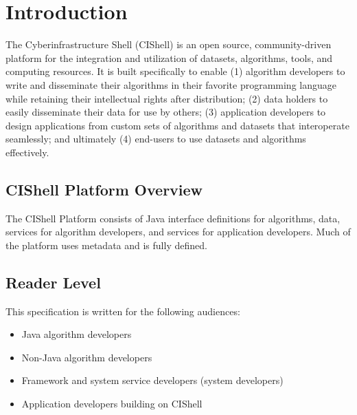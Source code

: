 \chapter{Introduction}

The Cyberinfrastructure Shell (CIShell) is an open source, community-driven
platform for the integration and utilization of datasets, algorithms, tools, and
computing resources. It is built specifically to enable (1) algorithm developers
to write and disseminate their algorithms in their favorite programming language
while retaining their intellectual rights after distribution; (2) data holders to
easily disseminate their data for use by others; (3) application developers to
design applications from custom sets of algorithms and datasets that interoperate
seamlessly; and ultimately (4) end-users to use datasets and algorithms
effectively.

\section{CIShell Platform Overview}

The CIShell Platform consists of Java interface definitions for algorithms, data,
services for algorithm developers, and services for application developers. Much
of the platform uses metadata and is fully defined.



\section{Reader Level}

This specification is written for the following audiences:
\begin{itemize}
  \item Java algorithm developers
  \item Non-Java algorithm developers
  \item Framework and system service developers (system developers)
  \item Application developers building on CIShell
\end{itemize}

